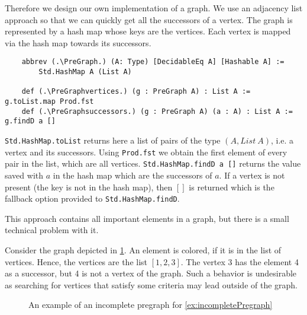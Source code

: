 Therefore we design our own implementation of a graph. We use an adjacency list approach so that we can quickly get all the successors of a vertex. The graph is represented by a hash map whose keys are the vertices. Each vertex is mapped via the hash map towards its successors.

\begin{lstlisting}
    abbrev (.\PreGraph.) (A: Type) [DecidableEq A] [Hashable A] := 
        Std.HashMap A (List A)

    def (.\PreGraphvertices.) (g : PreGraph A) : List A := g.toList.map Prod.fst
    def (.\PreGraphsuccessors.) (g : PreGraph A) (a : A) : List A := g.findD a []
\end{lstlisting}

\lstinline|Std.HashMap.toList| returns here a list of pairs of the type $(A, List\ A)$, i.e. a vertex and its successors. Using \lstinline|Prod.fst| we obtain the first element of every pair in the list, which are all vertices. \lstinline|Std.HashMap.findD a []| returns the value saved with $a$ in the hash map which are the successors of $a$. If a vertex is not present (the key is not in the hash map), then $[]$ is returned which is the fallback option provided to  \lstinline|Std.HashMap.findD|.

This approach contains all important elements in a graph, but there is a small technical problem with it. 

\begin{example}\label{ex:incompletePregraph}
    
    Consider the graph depicted in \cref{ex:counterexampleGraph}. An element is colored, if it is in the list of vertices. Hence, the vertices are the list $[1,2,3]$. The vertex 3 has the element 4 as a successor, but 4 is not a vertex of the graph. Such a behavior is undesirable as searching for vertices that satisfy some criteria may lead outside of the graph.

\begin{figure}
    \centering
    \caption{An example of an incomplete pregraph for \cref{ex:incompletePregraph}}      
    \label{ex:counterexampleGraph}

\end{figure}
    
\end{example}


